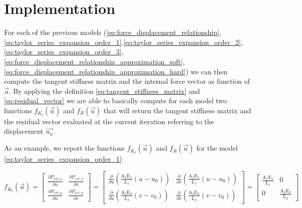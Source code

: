 \section{Implementation}
\label{sec:implementation}

For each of the previous models (\ref{eq:force_displacement_relationship},\ref{eq:taylor_series_expansion_order_1},\ref{eq:taylor_series_expansion_order_2},\ref{eq:taylor_series_expansion_order_3},\ref{eq:force_displacement_relationship_approximation_soft},\ref{eq:force_displacement_relationship_approximation_hard}) we can then compute the tangent stiffness matrix and the internal force vector as function of $\vec{u}$.
By applying the definition \ref{eq:tangent_stiffness_matrix} and \ref{eq:residual_vector} we are able to basically compute for each model two functions $f_{K_t}(\vec{u})$ and $f_{R}(\vec{u})$ that will return the tangent stiffness matrix and the residual vector evaluated at the current iteration referring to the displacement $\vec{u_n}$.

As an example, we report the functions $f_{K_t}(\vec{u})$ and $f_{R}(\vec{u})$ for the model \ref{eq:taylor_series_expansion_order_1}:

\begin{equation}
    f_{K_t}(\vec{u}) =
    \begin{bmatrix}
        \frac{\partial P_{ext,x}}{\partial u} & \frac{\partial P_{ext,x}}{\partial v} \\
        \frac{\partial P_{ext,y}}{\partial u} & \frac{\partial P_{ext,y}}{\partial v}
    \end{bmatrix}
    =
    \begin{bmatrix}
        \frac{\partial}{\partial u} \left( \frac{\text{A}_1 \text{E}_1}{L_1} \left( u - u_0 \right) \right) & \frac{\partial}{\partial v} \left( \frac{\text{A}_1 \text{E}_1}{L_1} \left( u - u_0 \right) \right) \\
        \frac{\partial}{\partial u} \left( \frac{\text{A}_2 \text{E}_2}{L_2} \left( v - v_0 \right) \right) & \frac{\partial}{\partial v} \left( \frac{\text{A}_2 \text{E}_2}{L_2} \left( v - v_0 \right) \right)
    \end{bmatrix}
    =
    \begin{bmatrix}
        \frac{\text{A}_1 \text{E}_1}{\text{L}_1} & 0                                        \\
        0                                        & \frac{\text{A}_2 \text{E}_2}{\text{L}_2}
    \end{bmatrix}
    \label{eq:tangent_stiffness_matrix_taylor_series_expansion_order_1}
\end{equation}

